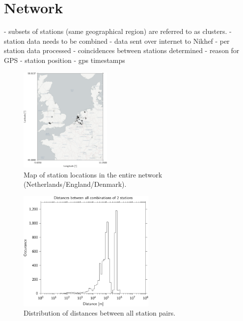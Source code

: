 \section{Network}
\label{sec:network-design}

- subsets of stations (same geographical region) are referred to as clusters.
- station data needs to be combined
- data sent over internet to Nikhef
    - per station data processed
    - coincidences between stations determined
- reason for GPS
    - station position
    - gps timestamps



\begin{figure}
    \centering
    \includegraphics[width=0.4\textwidth]{plots/experiment/network}
    \caption{Map of station locations in the entire \hisparc network (Netherlands/England/Denmark).}
    \label{fig:network-map}
\end{figure}

\begin{figure}
    \centering
    \includegraphics[width=0.6\textwidth]
                    {plots/experiment/network_station_distances}
    \caption{Distribution of distances between all station pairs.}
    \label{fig:network-distances}
\end{figure}


